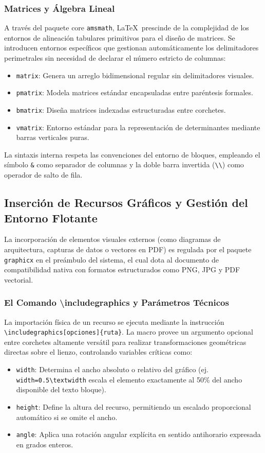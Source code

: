 \subsubsection{Matrices y Álgebra Lineal}
A través del paquete core \texttt{amsmath}, \LaTeX\ prescinde de la complejidad de los entornos de alineación tabulares primitivos para el diseño de matrices. Se introducen entornos específicos que gestionan automáticamente los delimitadores perimetrales sin necesidad de declarar el número estricto de columnas:
\begin{itemize}
    \item \texttt{matrix}: Genera un arreglo bidimensional regular sin delimitadores visuales.
    \item \texttt{pmatrix}: Modela matrices estándar encapsuladas entre paréntesis formales.
    \item \texttt{bmatrix}: Diseña matrices indexadas estructuradas entre corchetes.
    \item \texttt{vmatrix}: Entorno estándar para la representación de determinantes mediante barras verticales puras.
\end{itemize}
La sintaxis interna respeta las convenciones del entorno de bloques, empleando el símbolo \texttt{\&} como separador de columnas y la doble barra invertida (\texttt{\textbackslash\textbackslash}) como operador de salto de fila.

\subsection{Inserción de Recursos Gráficos y Gestión del Entorno Flotante}
La incorporación de elementos visuales externos (como diagramas de arquitectura, capturas de datos o vectores en PDF) es regulada por el paquete \texttt{graphicx} en el preámbulo del sistema, el cual dota al documento de compatibilidad nativa con formatos estructurados como PNG, JPG y PDF vectorial.

\subsubsection{El Comando \textbackslash includegraphics y Parámetros Técnicos}
La importación física de un recurso se ejecuta mediante la instrucción \\ \texttt{\textbackslash includegraphics[opciones]\{ruta\}}. La macro provee un argumento opcional entre corchetes altamente versátil para realizar transformaciones geométricas directas sobre el lienzo, controlando variables críticas como:
\begin{itemize}
    \item \texttt{width}: Determina el ancho absoluto o relativo del gráfico (ej. \texttt{width=0.5\textbackslash textwidth} escala el elemento exactamente al 50\% del ancho disponible del texto bloque).
    \item \texttt{height}: Define la altura del recurso, permitiendo un escalado proporcional automático si se omite el ancho.
    \item \texttt{angle}: Aplica una rotación angular explícita en sentido antihorario expresada en grados enteros.
\end{itemize}

